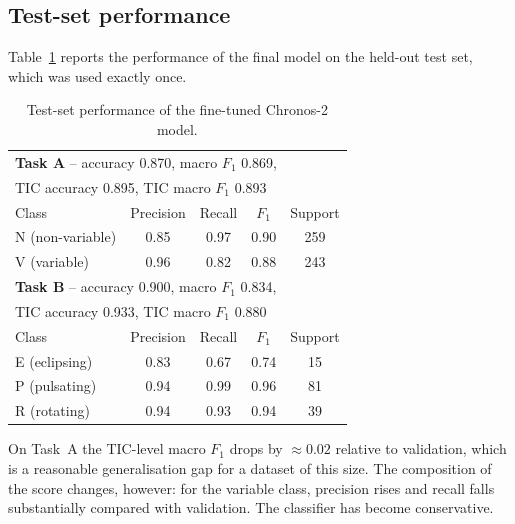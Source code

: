 \documentclass{aa}
\begin{document}
    \subsection{Test-set performance}

    Table~\ref{tab:test} reports the performance of the final model on the held-out test set,
    which was used exactly once.

    \begin{table}[!t]
        \caption{Test-set performance of the fine-tuned Chronos-2 model.}
        \label{tab:test}
        \centering
        \small
        \begin{tabular}{lcccc}
            \toprule
            \multicolumn{5}{l}{\textbf{Task A} -- accuracy 0.870, macro $F_1$ 0.869,} \\
            \multicolumn{5}{l}{\phantom{\textbf{Task A} -- }TIC accuracy 0.895, TIC macro $F_1$ 0.893} \\
            \midrule
            Class            & Precision & Recall & $F_1$ & Support \\
            \midrule
            N (non-variable) & 0.85      & 0.97   & 0.90  & 259     \\
            V (variable)     & 0.96      & 0.82   & 0.88  & 243     \\
            \midrule
            \multicolumn{5}{l}{\textbf{Task B} -- accuracy 0.900, macro $F_1$ 0.834,} \\
            \multicolumn{5}{l}{\phantom{\textbf{Task B} -- }TIC accuracy 0.933, TIC macro $F_1$ 0.880} \\
            \midrule
            Class            & Precision & Recall & $F_1$ & Support \\
            \midrule
            E (eclipsing)    & 0.83      & 0.67   & 0.74  & 15      \\
            P (pulsating)    & 0.94      & 0.99   & 0.96  & 81      \\
            R (rotating)     & 0.94      & 0.93   & 0.94  & 39      \\
            \bottomrule
        \end{tabular}
    \end{table}

    On Task~A the TIC-level macro $F_1$ drops by $\approx 0.02$ relative to validation, which
    is a reasonable generalisation gap for a dataset of this size. The composition of the
    score changes, however: for the variable class, precision rises and recall falls
    substantially compared with validation. The classifier has become conservative.
\end{document}
